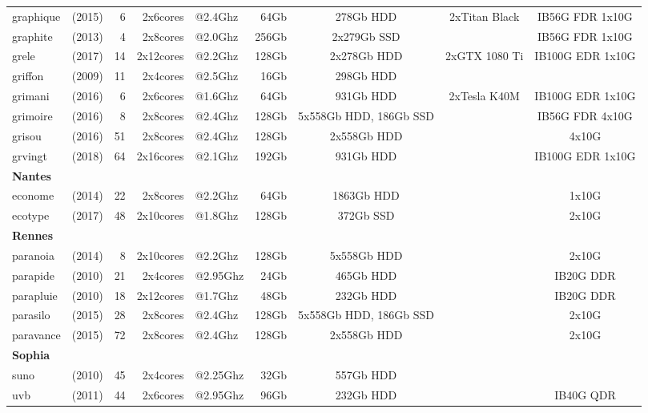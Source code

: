 \begin{center}
\begin{tabular}{|lr|r|rl|r|c|c|c|}
graphique & (2015) & 6 & 2x6cores & @2.4Ghz & 64Gb &  278Gb HDD & 2xTitan Black & IB56G FDR 1x10G \\
graphite & (2013) & 4 & 2x8cores & @2.0Ghz & 256Gb &  2x279Gb SSD &  & IB56G FDR 1x10G \\
grele & (2017) & 14 & 2x12cores & @2.2Ghz & 128Gb &  2x278Gb HDD & 2xGTX 1080 Ti & IB100G EDR 1x10G \\
griffon & (2009) & 11 & 2x4cores & @2.5Ghz & 16Gb &  298Gb HDD &  &  \\
grimani & (2016) & 6 & 2x6cores & @1.6Ghz & 64Gb &  931Gb HDD & 2xTesla K40M & IB100G EDR 1x10G \\
grimoire & (2016) & 8 & 2x8cores & @2.4Ghz & 128Gb &  5x558Gb HDD, 186Gb SSD &  & IB56G FDR 4x10G \\
grisou & (2016) & 51 & 2x8cores & @2.4Ghz & 128Gb &  2x558Gb HDD &  &  4x10G \\
grvingt & (2018) & 64 & 2x16cores & @2.1Ghz & 192Gb &  931Gb HDD &  & IB100G EDR 1x10G \\
\textbf{Nantes} &  &  &  &  &  &  &  &  \\
econome & (2014) & 22 & 2x8cores & @2.2Ghz & 64Gb &  1863Gb HDD &  &  1x10G \\
ecotype & (2017) & 48 & 2x10cores & @1.8Ghz & 128Gb &  372Gb SSD &  &  2x10G \\
\textbf{Rennes} &  &  &  &  &  &  &  &  \\
paranoia & (2014) & 8 & 2x10cores & @2.2Ghz & 128Gb &  5x558Gb HDD &  &  2x10G \\
parapide & (2010) & 21 & 2x4cores & @2.95Ghz & 24Gb &  465Gb HDD &  & IB20G DDR \\
parapluie & (2010) & 18 & 2x12cores & @1.7Ghz & 48Gb &  232Gb HDD &  & IB20G DDR \\
parasilo & (2015) & 28 & 2x8cores & @2.4Ghz & 128Gb &  5x558Gb HDD, 186Gb SSD &  &  2x10G \\
paravance & (2015) & 72 & 2x8cores & @2.4Ghz & 128Gb &  2x558Gb HDD &  &  2x10G \\
\textbf{Sophia} &  &  &  &  &  &  &  &  \\
suno & (2010) & 45 & 2x4cores & @2.25Ghz & 32Gb &  557Gb HDD &  &  \\
uvb & (2011) & 44 & 2x6cores & @2.95Ghz & 96Gb &  232Gb HDD &  & IB40G QDR \\
\hline 
\end{tabular}
\end{center}
